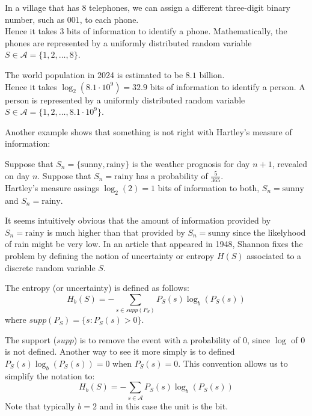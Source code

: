 \begin{eg}
    In a village that has $8$ telephones, we can assign a different three-digit binary number, such as $001$, to each phone. \\
    Hence it takes $3$ bits of information to identify a phone. Mathematically, the phones are represented by a uniformly distributed random variable $S \in \mathcal{A} = \{1,2, \ldots, 8\}$.
\end{eg}

\begin{eg}
    The world population in 2024 is estimated to be $8.1$ billion. \\
    Hence it takes $\log_2(8.1 \cdot 10^9) = 32.9$ bits of information to identify a person. A person is represented by a uniformly distributed random variable $S \in \mathcal{A} = \{1, 2, \ldots, 8.1 \cdot 10^9\}$.
\end{eg}
Another example shows that something is not right with Hartley's measure of information:

\begin{eg}
    Suppose that $S_n = \{\text{sunny}, \text{rainy}\}$ is the weather prognosis for day $n + 1$, revealed on day $n$. Suppose that $S_n = \text{rainy}$ has a probability of $\frac{5}{365}$. \\
    Hartley's measure assings $\log_2(2) = 1$ bits of information to both, $S_n = \text{sunny}$ and $S_n = \text{rainy}$.
\end{eg}
It seems intuitively obvious that the amount of information provided by $S_n = \text{rainy}$ is much higher than that provided by $S_n = \text{sunny}$ since the likelyhood of rain might be very low. In an article that appeared in 1948, Shannon fixes the problem by defining the notion of uncertainty or entropy $H(S)$ associated to a discrete random variable $S$.

\begin{definition}[Entropy]
    The entropy (or uncertainty) is defined as follows:
    \[
        H_b(S) = - \sum_{s \in supp(P_S)} P_S(s) \log_b(P_S(s))
    \]
    where $supp(P_S) = \{s: P_S(s) > 0\}$.
\end{definition}
The support ($supp$) is to remove the event with a probability of $0$, since $\log$ of $0$ is not defined. Another way to see it more simply is to defined $P_S(s)\log_b(P_S(s)) = 0$ when $P_S(s) = 0$. This convention allows us to simplify the notation to:
\[
    H_b(S) = - \sum_{s \in \mathcal{A}} P_S(s) \log_b(P_S(s))
\]
Note that typically $b = 2$ and in this case the unit is the bit.

